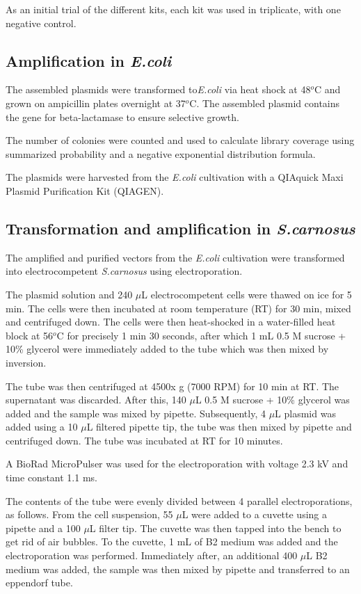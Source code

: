 \documentclass{article}
\begin{document}
\begin{multicols}{2}
	As an initial trial of the different kits, each kit was used in triplicate, with one negative control.
	
	\subsection{Amplification in \textit{E.coli}}
	The assembled plasmids were transformed to\textit{E.coli} via heat shock at 48$^o$C and grown on ampicillin plates overnight at 37$^o$C. The assembled plasmid contains the gene for beta-lactamase to ensure selective growth.
	
	The number of colonies were counted and used to calculate library coverage using summarized probability and a negative exponential distribution formula.
	
	The plasmids were harvested from the \textit{E.coli} cultivation with a QIAquick Maxi Plasmid Purification Kit (QIAGEN).
	
	\subsection{Transformation and amplification in \textit{S.carnosus}}
	The amplified and purified vectors from the \textit{E.coli} cultivation were transformed into electrocompetent \textit{S.carnosus} using electroporation.
	
	The plasmid solution and 240 $\mu$L electrocompetent cells were thawed on ice for 5 min. The cells were then incubated at room temperature (RT) for 30 min, mixed and centrifuged down. The cells were then heat-shocked in a water-filled heat block at 56$^o$C for precisely 1 min 30 seconds, after which 1 mL 0.5 M sucrose + 10\% glycerol were immediately added to the tube which was then mixed by inversion.
	
	The tube was then centrifuged at 4500x g (7000 RPM) for 10 min at RT. The supernatant was discarded. After this, 140 $\mu$L 0.5 M sucrose + 10\% glycerol was added and the sample was mixed by pipette. Subsequently, 4 $\mu$L plasmid was added using a 10 $\mu$L filtered pipette tip, the tube was then mixed by pipette and centrifuged down. The tube was incubated at RT for 10 minutes.
	
	A BioRad MicroPulser was used for the electroporation with voltage 2.3 kV and time constant 1.1 ms.
	
	The contents of the tube were evenly divided between 4 parallel electroporations, as follows. From the cell suspension, 55 $\mu$L were added to a cuvette using a pipette and a 100 $\mu$L filter tip. The cuvette was then tapped into the bench to get rid of air bubbles. To the cuvette, 1 mL of B2 medium was added and the electroporation was performed. Immediately after, an additional 400 $\mu$L B2  medium was added, the sample was then mixed by pipette and transferred to an eppendorf tube.
	

\end{multicols}
\end{document}
